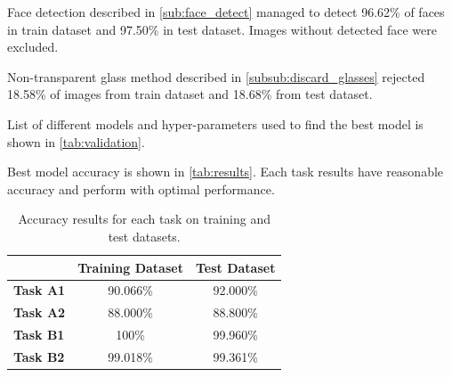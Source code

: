 \documentclass{article}
\begin{document}
Face detection described in \autoref{sub:face_detect} managed to detect 96.62\% of faces in train dataset and 97.50\%  in test dataset. Images without detected face were excluded. 

Non-transparent glass method described in \autoref{subsub:discard_glasses} rejected 18.58\% of images from train dataset and 18.68\% from test dataset.

List of different models and hyper-parameters used to find the best model is shown in \autoref{tab:validation}.

Best model accuracy is shown in \autoref{tab:results}. Each task results have reasonable accuracy and perform with optimal performance. 

\begin{table}[h!]
	\begin{center}
		\begin{tabular}{l|c|c} 
			 & \textbf{Training Dataset} & \textbf{Test Dataset} \\
			\hline
			\textbf{Task A1} & 90.066\% & 92.000\% \\
			\textbf{Task A2} & 88.000\% & 88.800\% \\
			\textbf{Task B1} & 100\% & 99.960\% \\
			\textbf{Task B2} & 99.018\% & 99.361\% \\
		\end{tabular}
		\caption{Accuracy results for each task on training and test datasets.}
		\label{tab:results}
	\end{center}
\end{table}
\end{document}
